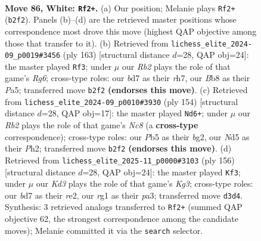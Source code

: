 \documentclass[11pt]{article}
\begin{document}
\clearpage

\begin{figure}[p]\centering
\begin{subfigure}{0.46\textwidth}\centering
\resizebox{\linewidth}{!}{%
\newchessgame
\chessboard[
  setfen={1B6/3b1k2/8/1P1N4/P3B3/3K3p/1R6/6r1 w - - 11 86},
  showmover=false,
  pgfstyle=straightmove, color=movearrow, markmove={b2-f2}
]}
\caption{}
\end{subfigure}\hfill
\begin{subfigure}{0.46\textwidth}\centering
\resizebox{\linewidth}{!}{%
\newchessgame
\chessboard[
  setfen={5k2/7R/8/p4K2/P4P2/6rp/8/4bB2 b - - 1 82},
  showmover=false,
  pgfstyle=straightmove, color=movearrow, markmove={g3-f3}
]}
\caption{}
\end{subfigure}
\\[4pt]
\begin{subfigure}{0.46\textwidth}\centering
\resizebox{\linewidth}{!}{%
\newchessgame
\chessboard[
  setfen={2N5/P1B3R1/8/5k2/8/KPn4p/6bP/8 w - - 1 78},
  showmover=false,
  pgfstyle=straightmove, color=movearrow, markmove={c8-d6}
]}
\caption{}
\end{subfigure}\hfill
\begin{subfigure}{0.46\textwidth}\centering
\resizebox{\linewidth}{!}{%
\newchessgame
\chessboard[
  setfen={8/1R1P4/5b2/2k5/1p2PB2/pP4K1/4r3/8 w - - 1 79},
  showmover=false,
  pgfstyle=straightmove, color=movearrow, markmove={g3-f3}
]}
\caption{}
\end{subfigure}
\caption{\textbf{Move 86, White: \texttt{Rf2+}.} (a) Our position; Melanie plays \texttt{Rf2+} (\texttt{b2f2}). Panels (b)--(d) are the retrieved master positions whose correspondence most drove this move (highest QAP objective among those that transfer to it). (b) Retrieved from \texttt{lichess\_elite\_2024-09\_p0019\#3456} (ply 163) [structural distance $d$=28, QAP obj=24]: the master played \texttt{Rf3}; under $\mu$ our \emph{Rb2} plays the role of that game's \emph{Rg6}; cross-type roles: our \emph{b}d7 as their \emph{r}h7, our \emph{B}b8 as their \emph{P}a5; transferred move \texttt{b2f2} \textbf{(endorses this move)}. (c) Retrieved from \texttt{lichess\_elite\_2024-09\_p0010\#3930} (ply 154) [structural distance $d$=28, QAP obj=17]: the master played \texttt{Nd6+}; under $\mu$ our \emph{Rb2} plays the role of that game's \emph{Nc8} (a \textbf{cross-type} correspondence); cross-type roles: our \emph{P}b5 as their \emph{b}g2, our \emph{N}d5 as their \emph{P}h2; transferred move \texttt{b2f2} \textbf{(endorses this move)}. (d) Retrieved from \texttt{lichess\_elite\_2025-11\_p0000\#3103} (ply 156) [structural distance $d$=28, QAP obj=24]: the master played \texttt{Kf3}; under $\mu$ our \emph{Kd3} plays the role of that game's \emph{Kg3}; cross-type roles: our \emph{b}d7 as their \emph{r}e2, our \emph{r}g1 as their \emph{p}a3; transferred move \texttt{d3d4}. Synthesis: 3 retrieved analogs transferred to \texttt{Rf2+} (summed QAP objective 62, the strongest correspondence among the candidate moves); Melanie committed it via the \texttt{search} selector.}
\label{fig:thought-m170}
\end{figure}
\end{document}

